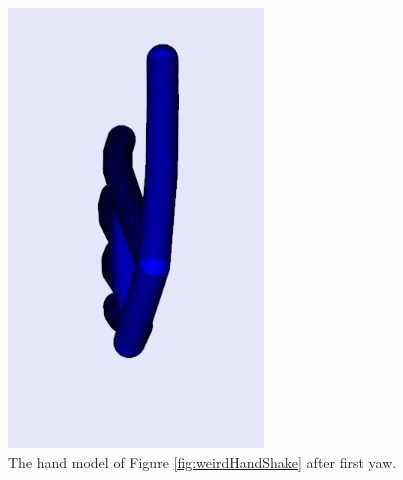 \begin{figure}[H]
\centering
\includegraphics[scale=0.35]{Figures/4_afterFirstYaw.JPG}
\caption[After First Yaw]{The hand model of Figure \ref{fig:weirdHandShake} after first yaw.}
\label{fig:afterFirstYaw}
\end{figure}

